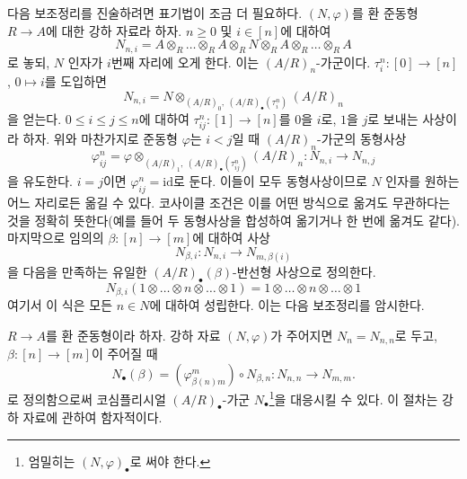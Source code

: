 \medskip\noindent
다음 보조정리를 진술하려면 표기법이 조금 더 필요하다.
$(N, \varphi)$를 환 준동형 $R \to A$에 대한 강하 자료라 하자.
$n \geq 0$ 및 $i \in [n]$에 대하여
$$
N_{n, i} =
A \otimes_R
\ldots
\otimes_R A \otimes_R N \otimes_R A \otimes_R
\ldots
\otimes_R A
$$
로 놓되, $N$ 인자가 $i$번째 자리에 오게 한다. 이는 $(A/R)_n$-가군이다.
$\tau^n_i : [0] \to [n]$, $0 \mapsto i$를 도입하면
$$
N_{n, i} = N \otimes_{(A/R)_0, \ (A/R)_\bullet(\tau^n_i)} (A/R)_n
$$
을 얻는다. $0 \leq i \leq j \leq n$에 대하여
$\tau^n_{ij} : [1] \to [n]$를 $0$을 $i$로, $1$을 $j$로 보내는 사상이라
하자. 위와 마찬가지로 준동형 $\varphi$는 $i < j$일 때
$(A/R)_n$-가군의 동형사상
$$
\varphi^n_{ij}
=
\varphi \otimes_{(A/R)_1, \ (A/R)_\bullet(\tau^n_{ij})} (A/R)_n :
N_{n, i} \longrightarrow N_{n, j}
$$
을 유도한다. $i = j$이면 $\varphi^n_{ij} = \text{id}$로 둔다. 이들이 모두
동형사상이므로 $N$ 인자를 원하는 어느 자리로든 옮길 수 있다. 코사이클
조건은 이를 어떤 방식으로 옮겨도 무관하다는 것을 정확히 뜻한다(예를 들어
두 동형사상을 합성하여 옮기거나 한 번에 옮겨도 같다). 마지막으로 임의의
$\beta : [n] \to [m]$에 대하여 사상
$$
N_{\beta, i} : N_{n, i} \to N_{m, \beta(i)}
$$
을 다음을 만족하는 유일한 $(A/R)_\bullet(\beta)$-반선형 사상으로 정의한다.
$$
N_{\beta, i}(1 \otimes \ldots \otimes n \otimes \ldots \otimes 1)
=
1 \otimes \ldots \otimes n \otimes \ldots \otimes 1
$$
여기서 이 식은 모든 $n \in N$에 대하여 성립한다.
이는 다음 보조정리를 암시한다.

\begin{lemma}
\label{lemma-descent-datum-cosimplicial}
$R \to A$를 환 준동형이라 하자.
강하 자료 $(N, \varphi)$가 주어지면 $N_n = N_{n, n}$로 두고,
$\beta : [n] \to [m]$이 주어질 때
$$
N_\bullet(\beta) = (\varphi^m_{\beta(n)m}) \circ N_{\beta, n} :
N_{n, n} \longrightarrow N_{m, m}.
$$
로 정의함으로써 코심플리시얼 $(A/R)_\bullet$-가군
$N_\bullet$\footnote{엄밀히는 $(N, \varphi)_\bullet$로 써야 한다.}을
대응시킬 수 있다. 이 절차는 강하 자료에 관하여 함자적이다.
\end{lemma}

